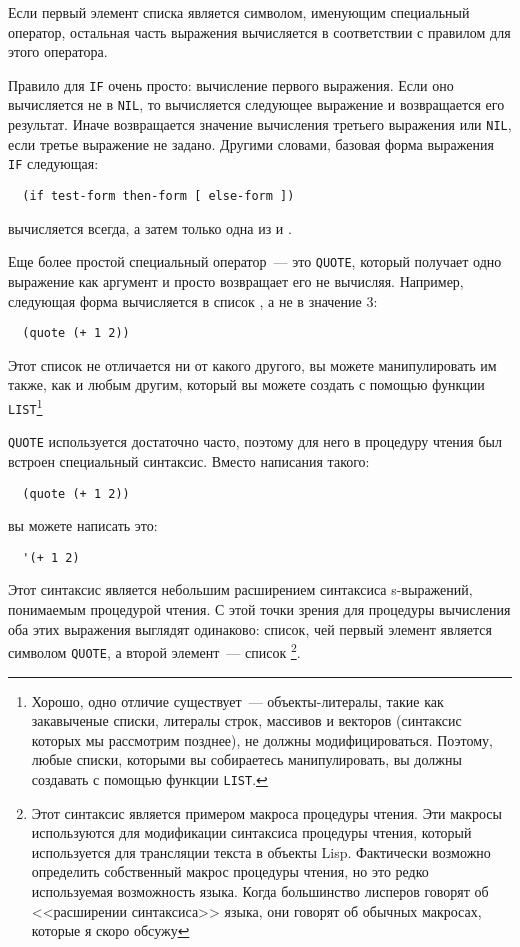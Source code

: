 Если первый элемент списка является символом, именующим специальный оператор, остальная
часть выражения вычисляется в соответствии с правилом для этого оператора.

Правило для \lstinline{IF} очень просто: вычисление первого выражения. Если оно вычисляется
не в \lstinline{NIL}, то вычисляется следующее выражение и возвращается его результат. Иначе
возвращается значение вычисления третьего выражения или \lstinline{NIL}, если третье
выражение не задано. Другими словами, базовая форма выражения \lstinline{IF} следующая:

\begin{lstlisting}
  (if test-form then-form [ else-form ])
\end{lstlisting}

 вычисляется всегда, а затем только одна из  и
.

Еще более простой специальный оператор~--- это \lstinline{QUOTE}, который получает одно
выражение как аргумент и просто возвращает его не вычисляя. Например, следующая форма
вычисляется в список , а не в значение 3:

\begin{lstlisting}
  (quote (+ 1 2))
\end{lstlisting}

Этот список не отличается ни от какого другого, вы можете манипулировать им также, как и
любым другим, который вы можете создать с помощью функции \lstinline{LIST}\footnote{Хорошо,
  одно отличие существует~--- объекты-литералы, такие как закавыченые списки, литералы
  строк, массивов и векторов (синтаксис которых мы рассмотрим позднее), не должны
  модифицироваться. Поэтому, любые списки, которыми вы собираетесь манипулировать, вы
  должны создавать с помощью функции \lstinline{LIST}.}

\lstinline{QUOTE} используется достаточно часто, поэтому для него в процедуру чтения был
встроен специальный синтаксис. Вместо написания такого:

\begin{lstlisting}
  (quote (+ 1 2))
\end{lstlisting}

вы можете написать это:

\begin{lstlisting}
  '(+ 1 2)
\end{lstlisting}

Этот синтаксис является небольшим расширением синтаксиса s-выражений, понимаемым
процедурой чтения. С этой точки зрения для процедуры вычисления оба этих выражения
выглядят одинаково: список, чей первый элемент является символом \lstinline{QUOTE}, а второй
элемент~--- список \footnote{Этот синтаксис является примером макроса
  процедуры чтения. Эти макросы используются для модификации синтаксиса процедуры чтения,
  который используется для трансляции текста в объекты Lisp. Фактически возможно
  определить собственный макрос процедуры чтения, но это редко используемая возможность
  языка. Когда большинство лисперов говорят об <<расширении синтаксиса>> языка, они говорят
  об обычных макросах, которые я скоро обсужу}.

